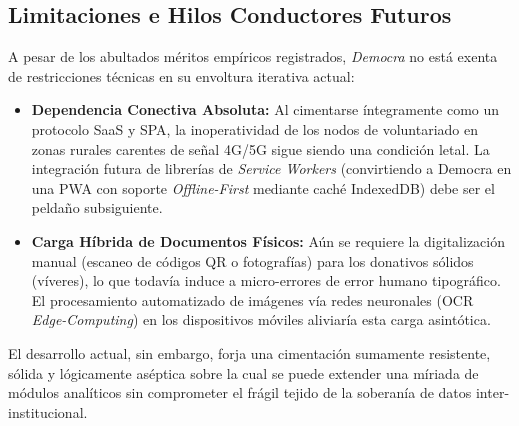 \subsection{Limitaciones e Hilos Conductores Futuros}

A pesar de los abultados m\'eritos emp\'iricos registrados, \textit{Democra} no est\'a exenta de restricciones t\'ecnicas en su envoltura iterativa actual:
\begin{itemize}
    \item \textbf{Dependencia Conectiva Absoluta:} Al cimentarse \'integramente como un protocolo SaaS y SPA, la inoperatividad de los nodos de voluntariado en zonas rurales carentes de se\~nal 4G/5G sigue siendo una condici\'on letal. La integraci\'on futura de librer\'ias de \textit{Service Workers} (convirtiendo a Democra en una PWA con soporte \textit{Offline-First} mediante cach\'e IndexedDB) debe ser el pelda\~no subsiguiente.
    \item \textbf{Carga H\'ibrida de Documentos F\'isicos:} A\'un se requiere la digitalizaci\'on manual (escaneo de c\'odigos QR o fotograf\'ias) para los donativos s\'olidos (v\'iveres), lo que todav\'ia induce a micro-errores de error humano tipogr\'afico. El procesamiento automatizado de im\'agenes v\'ia redes neuronales (OCR \textit{Edge-Computing}) en los dispositivos m\'oviles aliviar\'ia esta carga asint\'otica.
\end{itemize}

El desarrollo actual, sin embargo, forja una cimentaci\'on sumamente resistente, s\'olida y l\'ogicamente as\'eptica sobre la cual se puede extender una m\'iriada de m\'odulos anal\'iticos sin comprometer el fr\'agil tejido de la soberan\'ia de datos inter-institucional.

